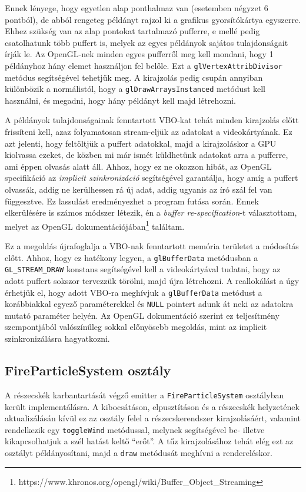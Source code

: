 Ennek lényege, hogy egyetlen alap ponthalmaz van (esetemben négyzet 6 pontból), de abból rengeteg példányt rajzol ki a grafikus gyorsítókártya egyszerre. Ehhez szükség van az alap pontokat tartalmazó pufferre, e mellé pedig csatolhatunk több puffert is, melyek az egyes példányok sajátos tulajdonságait írják le. Az OpenGL-nek minden egyes pufferről meg kell mondani, hogy 1 példányhoz hány elemet használjon fel belőle. Ezt a \texttt{glVertexAttribDivisor} metódus segítségével tehetjük meg. A kirajzolás pedig csupán annyiban különbözik a normálistól, hogy a \texttt{glDrawArraysInstanced} metódust kell használni, és megadni, hogy hány példányt kell majd létrehozni.

A példányok tulajdonságainak fenntartott VBO-kat tehát minden kirajzolás előtt frissíteni kell, azaz folyamatosan stream-eljük az adatokat a videokártyának. Ez azt jelenti, hogy feltöltjük a puffert adatokkal, majd a kirajzoláskor a GPU kiolvassa ezeket, de közben mi már ismét küldhetünk adatokat arra a pufferre, ami éppen olvasás alatt áll. Ahhoz, hogy ez ne okozzon hibát, az OpenGL specifikáció az \textit{implicit szinkronizáció} segítségével garantálja, hogy amíg a puffert olvassák, addig ne kerülhessen rá új adat, addig ugyanis az író szál fel van függesztve. Ez lassulást eredményezhet a program futása során. Ennek elkerülésére is számos módszer létezik, én a \textit{buffer re-specification}-t választottam, melyet az OpenGL dokumentációjában\footnote{https://www.khronos.org/opengl/wiki/Buffer\_Object\_Streaming} találtam.

 Ez a megoldás újrafoglalja a VBO-nak fenntartott memória területet a módosítás előtt. Ahhoz, hogy ez hatékony legyen, a \texttt{glBufferData} metódusban a \texttt{GL\_STREAM\_DRAW} konstans segítségével kell a videokártyával tudatni, hogy az adott puffert sokszor tervezzük törölni, majd újra létrehozni. A reallokálást a úgy érhetjük el, hogy adott VBO-ra meghívjuk a \texttt{glBufferData} metódust a korábbiakkal egyező paraméterekkel és \texttt{NULL} pointert adunk át neki az adatokra mutató paraméter helyén. Az OpenGL dokumentáció szerint ez teljesítmény szempontjából valószínűleg sokkal előnyösebb megoldás, mint az implicit szinkronizálásra hagyatkozni.

\subsection{FireParticleSystem osztály}
A részecskék karbantartását végző emitter a \texttt{FireParticleSystem} osztályban került implementálásra. A kibocsátáson, elpusztításon és a részecskék helyzetének aktualizálásán kívül ez az osztály felel a részecskerendszer kirajzolásáért, valamint rendelkezik egy \texttt{toggleWind} metódussal, melynek segítségével be- illetve kikapcsolhatjuk a szél hatást keltő ``erőt''. A tűz kirajzolásához tehát elég ezt az osztályt példányosítani, majd a \texttt{draw} metódusát meghívni a rendereléskor.

